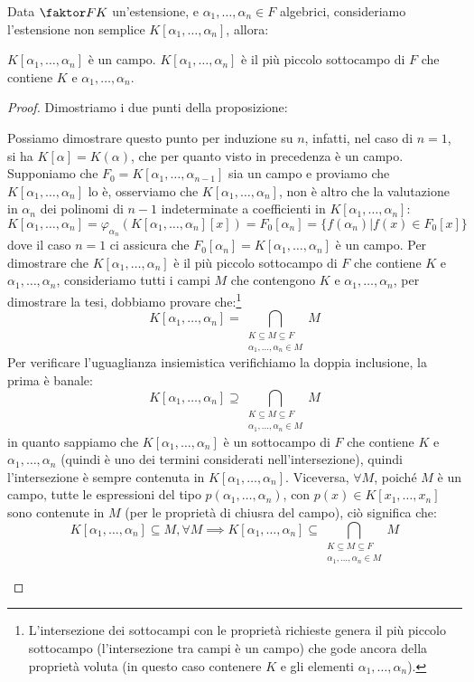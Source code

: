 \documentclass[11pt]{scrartcl}
\begin{document}
\begin{proposition}
Data $\faktor FK$ un'estensione, e $\alpha_1,\ldots,\alpha_n \in F$ algebrici, consideriamo l'estensione non semplice $K[\alpha_1,\ldots,\alpha_n]$, allora:
	\begin{enumerate}[(1)]
	\ii $K[\alpha_1,\ldots,\alpha_n]$ è un campo.
	\ii $K[\alpha_1,\ldots,\alpha_n]$ è il più piccolo sottocampo di $F$ che contiene $K$ e $\alpha_1,\ldots,\alpha_n$.
	\end{enumerate}
\end{proposition}

\begin{proof}
Dimostriamo i due punti della proposizione:
	\begin{enumerate}[(1)]
	\ii Possiamo dimostrare questo punto per induzione su $n$, infatti, nel caso di $n=1$, si ha $K[\alpha] = K(\alpha)$, che per quanto visto in precedenza è un campo. Supponiamo che $F_0 = K[\alpha_1,\ldots,\alpha_{n-1}]$ sia un campo e proviamo che $K[\alpha_1,\ldots,\alpha_n]$ lo è, osserviamo che $K[\alpha_1,\ldots,\alpha_n]$, non è altro che la valutazione in $\alpha_n$ dei polinomi di $n-1$ indeterminate a coefficienti in $K[\alpha_1,\ldots,\alpha_n]$:
		\[ K[\alpha_1,\ldots,\alpha_n] = \varphi_{\alpha_n}(K[\alpha_1,\ldots,\alpha_n][x]) = F_0[\alpha_n]=\{f(\alpha_n) | f(x) \in F_0[x]\}
		\]
		dove il caso $n=1$ ci assicura che $F_0[\alpha_n] = K[\alpha_1,\ldots,\alpha_n]$ è un campo.
	\ii Per dimostrare che $K[\alpha_1,\ldots,\alpha_n]$ è il più piccolo sottocampo di $F$ che contiene $K$ e $\alpha_1,\ldots,\alpha_n$, consideriamo tutti i campi $M$ che contengono $K$ e $\alpha_1,\ldots,\alpha_n$, per dimostrare la tesi, dobbiamo provare che:\footnote{L'intersezione dei sottocampi con le proprietà richieste genera il più piccolo sottocampo (l'intersezione tra campi è un campo) che gode ancora della proprietà voluta (in questo caso contenere $K$ e gli elementi $\alpha_1,\ldots,\alpha_n$).}
		\[ K[\alpha_1,\ldots,\alpha_n] = \bigcap_{\substack{K \subseteq M \subseteq F \\ \alpha_1,\ldots,\alpha_n \in M}}M
		\]
Per verificare l'uguaglianza insiemistica verifichiamo la doppia inclusione, la prima è banale:
	\[  K[\alpha_1,\ldots,\alpha_n] \supseteq \bigcap_{\substack{K \subseteq M \subseteq F \\ \alpha_1,\ldots,\alpha_n \in M}}M
	\]
in quanto sappiamo che $K[\alpha_1,\ldots,\alpha_n]$ è un sottocampo di $F$ che contiene $K$ e $\alpha_1,\ldots,\alpha_n$ (quindi è uno dei termini considerati nell'intersezione), quindi l'intersezione è sempre contenuta in $K[\alpha_1,\ldots,\alpha_n]$.
Viceversa, $\forall M$, poiché $M$ è un campo, tutte le espressioni del tipo $p(\alpha_1,\ldots,\alpha_n)$, con $p(x) \in K[x_1,\ldots,x_n]$ sono contenute in $M$ (per le proprietà di chiusra del campo), ciò significa che:
	\[ K[\alpha_1,\ldots,\alpha_n] \subseteq M, \forall M \implies K[\alpha_1,\ldots,\alpha_n] \subseteq \bigcap_{\substack{K \subseteq M \subseteq F \\ \alpha_1,\ldots,\alpha_n \in M}}M
	\]
	\end{enumerate}
\end{proof}
\end{document}
